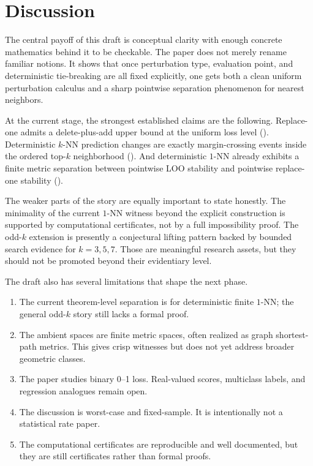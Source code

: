\section{Discussion}
\label{sec:discussion}

The central payoff of this draft is conceptual clarity with enough concrete
mathematics behind it to be checkable. The paper does not merely rename
familiar notions. It shows that once perturbation type, evaluation point, and
deterministic tie-breaking are all fixed explicitly, one gets both a clean
uniform perturbation calculus and a sharp pointwise separation phenomenon for
nearest neighbors.

At the current stage, the strongest established claims are the following.
Replace-one admits a delete-plus-add upper bound at the uniform loss level
(). Deterministic $k$-NN prediction changes are
exactly margin-crossing events inside the ordered top-$k$ neighborhood
(). And deterministic $1$-NN already exhibits a
finite metric separation between pointwise LOO stability and pointwise
replace-one stability ().

The weaker parts of the story are equally important to state honestly. The
minimality of the current $1$-NN witness beyond the explicit construction is
supported by computational certificates, not by a full impossibility proof. The
odd-$k$ extension is presently a conjectural lifting pattern backed by bounded
search evidence for $k=3,5,7$. Those are meaningful research assets, but they
should not be promoted beyond their evidentiary level.

The draft also has several limitations that shape the next phase.
\begin{enumerate}[leftmargin=*,label=(\arabic*)]
    \item The current theorem-level separation is for deterministic finite
    $1$-NN; the general odd-$k$ story still lacks a formal proof.
    \item The ambient spaces are finite metric spaces, often realized as graph
    shortest-path metrics. This gives crisp witnesses but does not yet address
    broader geometric classes.
    \item The paper studies binary 0--1 loss. Real-valued scores, multiclass
    labels, and regression analogues remain open.
    \item The discussion is worst-case and fixed-sample. It is intentionally not
    a statistical rate paper.
    \item The computational certificates are reproducible and well documented,
    but they are still certificates rather than formal proofs.
\end{enumerate}

